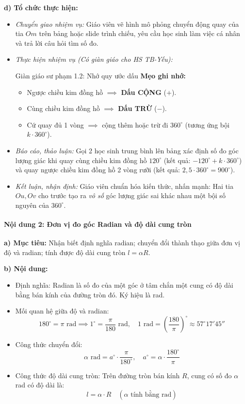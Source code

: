 \documentclass[12pt, a4paper]{article}
\begin{document}
\textbf{d) Tổ chức thực hiện:}
\begin{itemize}[leftmargin=0.6cm]
    \item \textit{Chuyển giao nhiệm vụ:} Giáo viên vẽ hình mô phỏng chuyển động quay của tia $Om$ trên bảng hoặc slide trình chiếu, yêu cầu học sinh làm việc cá nhân và trả lời câu hỏi tìm số đo.
    \item \textit{Thực hiện nhiệm vụ (Có giàn giáo cho HS TB-Yếu):}
    \begin{scaffoldbox}{Giàn giáo sư phạm 1.2: Nhớ quy ước dấu}
        \textbf{Mẹo ghi nhớ:}
        \begin{itemize}[leftmargin=0.5cm]
            \item Ngược chiều kim đồng hồ $\implies$ \textbf{Dấu CỘNG} ($+$).
            \item Cùng chiều kim đồng hồ $\implies$ \textbf{Dấu TRỪ} ($-$).
            \item Cứ quay đủ 1 vòng $\implies$ cộng thêm hoặc trừ đi $360^\circ$ (tương ứng bội $k \cdot 360^\circ$).
        \end{itemize}
    \end{scaffoldbox}
    \item \textit{Báo cáo, thảo luận:} Gọi 2 học sinh trung bình lên bảng xác định số đo góc lượng giác khi quay cùng chiều kim đồng hồ $120^\circ$ (kết quả: $-120^\circ + k \cdot 360^\circ$) và quay ngược chiều kim đồng hồ 2 vòng rưỡi (kết quả: $2{,}5 \cdot 360^\circ = 900^\circ$).
    \item \textit{Kết luận, nhận định:} Giáo viên chuẩn hóa kiến thức, nhấn mạnh: Hai tia $Ou, Ov$ cho trước tạo ra \textit{vô số} góc lượng giác sai khác nhau một bội số nguyên của $360^\circ$.
\end{itemize}

\paragraph{Nội dung 2: Đơn vị đo góc Radian và độ dài cung tròn}
\textbf{a) Mục tiêu:} Nhận biết định nghĩa radian; chuyển đổi thành thạo giữa đơn vị độ và radian; tính được độ dài cung tròn $l = \alpha R$.

\textbf{b) Nội dung:}
\begin{itemize}[leftmargin=0.6cm]
    \item Định nghĩa: Radian là số đo của một góc ở tâm chắn một cung có độ dài bằng bán kính của đường tròn đó. Ký hiệu là rad.
    \item Mối quan hệ giữa độ và radian:
    $$180^\circ = \pi \text{ rad} \implies 1^\circ = \dfrac{\pi}{180} \text{ rad}, \quad 1 \text{ rad} = \left(\dfrac{180}{\pi}\right)^\circ \approx 57^\circ 17' 45''$$
    \item Công thức chuyển đổi:
    $$\alpha \text{ rad} = a^\circ \cdot \dfrac{\pi}{180^\circ}, \quad a^\circ = \alpha \cdot \dfrac{180^\circ}{\pi}$$
    \item Công thức độ dài cung tròn: Trên đường tròn bán kính $R$, cung có số đo $\alpha$ rad có độ dài là:
    $$l = \alpha \cdot R \quad (\alpha \text{ tính bằng rad})$$
\end{itemize}
\end{document}
